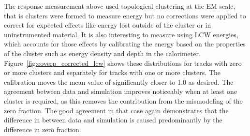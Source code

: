 The response measurement above used topological clustering at the EM scale, that is clusters were formed to measure energy but no corrections were applied to correct for expected effects like energy lost outside of the cluster or in uninstrumented material. 
It is also interesting to measure \epcor using \ac{LCW} energies, which accounts for those effects by calibrating the energy based on the properties of the cluster such as energy density and depth in the calorimeter.
Figure~\ref{fig:eoverp_corrected_lcw} shows these distributions for tracks with zero or more clusters and separately for tracks with one or more clusters.
The calibration moves the mean value of \epcor significantly closer to 1.0 as desired.
The agreement between data and simulation improves noticeably when at least one cluster is required, as this removes the contribution from the mismodeling of the zero fraction. 
The good agreement in that case again demonstrates that the difference in \epcor between data and simulation is caused predominantly by the difference in zero fraction.

